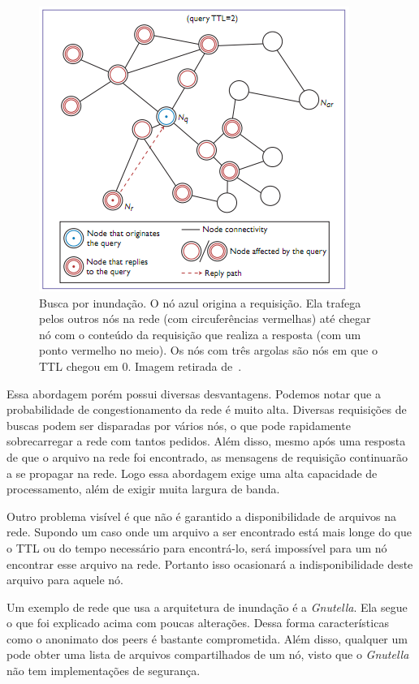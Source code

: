 \begin{figure}
	\centering
	\includegraphics[scale=0.75]{images/flooding-architecture.png}
	\caption{Busca por inundação. O nó azul origina a requisição. Ela trafega pelos outros nós na rede (com circuferências vermelhas) até chegar nó com o conteúdo da requisição que realiza a resposta (com um ponto vermelho no meio). Os nós com três argolas são nós em que o TTL chegou em 0. Imagem retirada de~\cite{dovalScalable01}.}
	\label{fig:flooding-architecture}
\end{figure}

Essa abordagem porém possui diversas desvantagens. Podemos notar que a probabilidade de congestionamento da rede é muito alta. Diversas requisições de buscas podem ser disparadas por vários nós, o que pode rapidamente sobrecarregar a rede com tantos pedidos. Além disso, mesmo após uma resposta de que o arquivo na rede foi encontrado, as mensagens de requisição continuarão a se propagar na rede. Logo essa abordagem exige uma alta capacidade de processamento, além de exigir muita largura de banda.

Outro problema visível é que não é garantido a disponibilidade de arquivos na rede. Supondo um caso onde um arquivo a ser encontrado está mais longe do que o TTL ou do tempo necessário para encontrá-lo, será impossível para um nó encontrar esse arquivo na rede. Portanto isso ocasionará a indisponibilidade deste arquivo para aquele nó.

Um exemplo de rede que usa a arquitetura de inundação é a \emph{Gnutella}. Ela segue o que foi explicado acima com poucas alterações. Dessa forma características como o anonimato dos peers é bastante comprometida. Além disso, qualquer um pode obter uma lista de arquivos compartilhados de um nó, visto que o \emph{Gnutella} não tem implementações de segurança.

